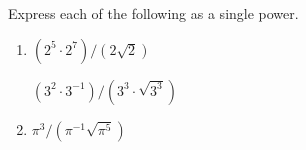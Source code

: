 Express each of the following as a single power.  

\begin{enumerate}
\item   $(2^5\cdot 2^7)/(2\sqrt{2})$

 $(3^2\cdot 3^{-1})/(3^3\cdot \sqrt{3^3})$

%

\item   $\pi^3/(\pi^{-1}\sqrt{\pi^5})$

\end{enumerate}
